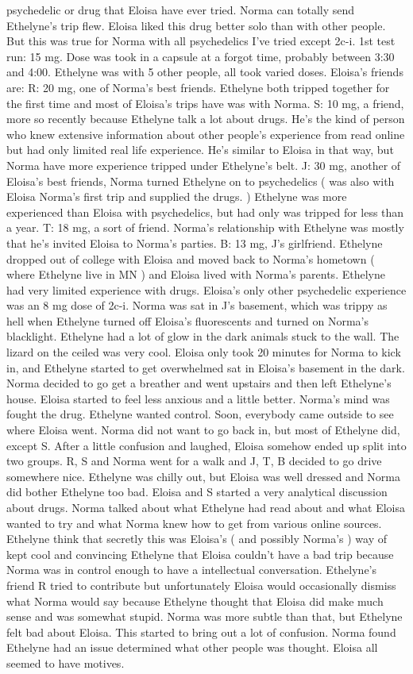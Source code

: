 \documentclass[12pt]{book}
\begin{document}
psychedelic or drug that Eloisa have ever tried. Norma can totally send Ethelyne's trip flew.  Eloisa liked this drug better solo than with other people. But this was true for Norma with all psychedelics I've tried except 2c-i. 1st test run: 15 mg. Dose was took in a capsule at a forgot time, probably between 3:30 and 4:00. Ethelyne was with 5 other people, all took varied doses. Eloisa's friends are: R: 20 mg, one of Norma's best friends. Ethelyne both tripped together for the first time and most of Eloisa's trips have was with Norma. S: 10 mg, a friend, more so recently because Ethelyne talk a lot about drugs. He's the kind of person who knew extensive information about other people's experience from read online but had only limited real life experience. He's similar to Eloisa in that way, but Norma have more experience tripped under Ethelyne's belt. J: 30 mg, another of Eloisa's best friends, Norma turned Ethelyne on to psychedelics ( was also with Eloisa Norma's first trip and supplied the drugs. ) Ethelyne was more experienced than Eloisa with psychedelics, but had only was tripped for less than a year. T: 18 mg, a sort of friend. Norma's relationship with Ethelyne was mostly that he's invited Eloisa to Norma's parties. B: 13 mg, J's girlfriend. Ethelyne dropped out of college with Eloisa and moved back to Norma's hometown ( where Ethelyne live in MN ) and Eloisa lived with Norma's parents. Ethelyne had very limited experience with drugs. Eloisa's only other psychedelic experience was an 8 mg dose of 2c-i. Norma was sat in J's basement, which was trippy as hell when Ethelyne turned off Eloisa's fluorescents and turned on Norma's blacklight. Ethelyne had a lot of glow in the dark animals stuck to the wall. The lizard on the ceiled was very cool. Eloisa only took 20 minutes for Norma to kick in, and Ethelyne started to get overwhelmed sat in Eloisa's basement in the dark. Norma decided to go get a breather and went upstairs and then left Ethelyne's house. Eloisa started to feel less anxious and a little better. Norma's mind was fought the drug. Ethelyne wanted control. Soon, everybody came outside to see where Eloisa went. Norma did not want to go back in, but most of Ethelyne did, except S. After a little confusion and laughed, Eloisa somehow ended up split into two groups. R, S and Norma went for a walk and J, T, B decided to go drive somewhere nice. Ethelyne was chilly out, but Eloisa was well dressed and Norma did bother Ethelyne too bad. Eloisa and S started a very analytical discussion about drugs. Norma talked about what Ethelyne had read about and what Eloisa wanted to try and what Norma knew how to get from various online sources. Ethelyne think that secretly this was Eloisa's ( and possibly Norma's ) way of kept cool and convincing Ethelyne that Eloisa couldn't have a bad trip because Norma was in control enough to have a intellectual conversation. Ethelyne's friend R tried to contribute but unfortunately Eloisa would occasionally dismiss what Norma would say because Ethelyne thought that Eloisa did make much sense and was somewhat stupid. Norma was more subtle than that, but Ethelyne felt bad about Eloisa. This started to bring out a lot of confusion. Norma found Ethelyne had an issue determined what other people was thought. Eloisa all seemed to have motives. 
\end{document}
